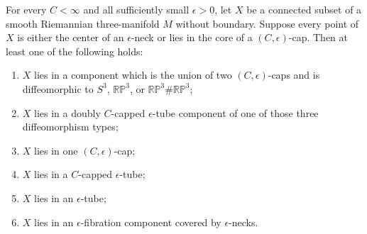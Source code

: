 \begin{theorem}
\label{thm:cap-and-neck-cover-classification}
\notready
For every $C<\infty$ and all sufficiently small $\epsilon>0$, let $X$ be
a connected subset of a smooth Riemannian three-manifold $M$ without
boundary.  Suppose every
point of $X$ is either the center of an $\epsilon$-neck or lies in the core
of a $(C,\epsilon)$-cap.  Then at least one of the following holds:
\begin{enumerate}
\item $X$ lies in a component which is the union of two
      $(C,\epsilon)$-caps and is diffeomorphic to
      $S^3$, $\mathbb{RP}^3$, or
      $\mathbb{RP}^3\#\mathbb{RP}^3$;
\item $X$ lies in a doubly $C$-capped $\epsilon$-tube component of one
      of those three diffeomorphism types;
\item $X$ lies in one $(C,\epsilon)$-cap;
\item $X$ lies in a $C$-capped $\epsilon$-tube;
\item $X$ lies in an $\epsilon$-tube;
\item $X$ lies in an $\epsilon$-fibration component covered by
      $\epsilon$-necks.
\end{enumerate}
\end{theorem}

